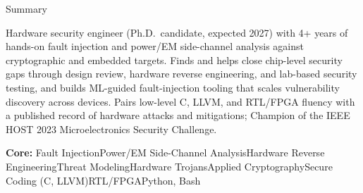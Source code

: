 \documentclass{resume} %
\newcommand{\kw}{\;{\color{accent}$\diamond$}\;}
\begin{document}

\begin{rSection}{Summary}

Hardware security engineer (Ph.D.\ candidate, expected 2027) with 4+ years of hands-on fault injection and power/EM side-channel analysis against cryptographic and embedded targets. Finds and helps close chip-level security gaps through design review, hardware reverse engineering, and lab-based security testing, and builds ML-guided fault-injection tooling that scales vulnerability discovery across devices. Pairs low-level C, LLVM, and RTL/FPGA fluency with a published record of hardware attacks and mitigations; Champion of the IEEE HOST 2023 Microelectronics Security Challenge.

\smallskip
{\small\textbf{Core:} Fault Injection\kw Power/EM Side-Channel Analysis\kw Hardware Reverse Engineering\kw Threat Modeling\kw Hardware Trojans\kw Applied Cryptography\kw Secure Coding (C, LLVM)\kw RTL/FPGA\kw Python, Bash}
\end{rSection}







\end{document}
